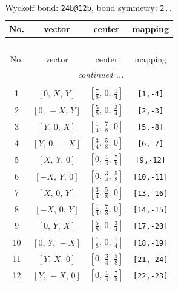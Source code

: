\documentclass[fleqn,8pt]{jsarticle}
\begin{document}
\renewcommand{\arraystretch}{1.2}
\begin{longtable}{cccc}
\caption{Wyckoff bond: {\tt 24b@12b}, bond symmetry: {\tt 2..}}
 \\
 \hline \hline
No. & vector & center & mapping \\ \hline \endfirsthead

\multicolumn{3}{l}{\tablename\ \thetable{}} \\
 \hline \hline
No. & vector & center & mapping \\ \hline \endhead

 \hline \hline
\multicolumn{3}{r}{\footnotesize\it continued ...} \\ \endfoot

 \hline \hline
\multicolumn{3}{r}{} \\ \endlastfoot

1 & $\left[ 0,\, X,\, Y \right]$ & $\left[ \frac{7}{8},\, 0,\, \frac{1}{4} \right]$ & {\tt [1,-4]} \\ \hline
2 & $\left[ 0,\, - X,\, Y \right]$ & $\left[ \frac{5}{8},\, 0,\, \frac{3}{4} \right]$ & {\tt [2,-3]} \\ \hline
3 & $\left[ Y,\, 0,\, X \right]$ & $\left[ \frac{1}{4},\, \frac{7}{8},\, 0 \right]$ & {\tt [5,-8]} \\ \hline
4 & $\left[ Y,\, 0,\, - X \right]$ & $\left[ \frac{3}{4},\, \frac{5}{8},\, 0 \right]$ & {\tt [6,-7]} \\ \hline
5 & $\left[ X,\, Y,\, 0 \right]$ & $\left[ 0,\, \frac{1}{4},\, \frac{7}{8} \right]$ & {\tt [9,-12]} \\ \hline
6 & $\left[ - X,\, Y,\, 0 \right]$ & $\left[ 0,\, \frac{3}{4},\, \frac{5}{8} \right]$ & {\tt [10,-11]} \\ \hline
7 & $\left[ X,\, 0,\, Y \right]$ & $\left[ \frac{3}{4},\, \frac{5}{8},\, 0 \right]$ & {\tt [13,-16]} \\ \hline
8 & $\left[ - X,\, 0,\, Y \right]$ & $\left[ \frac{1}{4},\, \frac{7}{8},\, 0 \right]$ & {\tt [14,-15]} \\ \hline
9 & $\left[ 0,\, Y,\, X \right]$ & $\left[ \frac{5}{8},\, 0,\, \frac{3}{4} \right]$ & {\tt [17,-20]} \\ \hline
10 & $\left[ 0,\, Y,\, - X \right]$ & $\left[ \frac{7}{8},\, 0,\, \frac{1}{4} \right]$ & {\tt [18,-19]} \\ \hline
11 & $\left[ Y,\, X,\, 0 \right]$ & $\left[ 0,\, \frac{3}{4},\, \frac{5}{8} \right]$ & {\tt [21,-24]} \\ \hline
12 & $\left[ Y,\, - X,\, 0 \right]$ & $\left[ 0,\, \frac{1}{4},\, \frac{7}{8} \right]$ & {\tt [22,-23]} \\
\end{longtable}
\end{document}
